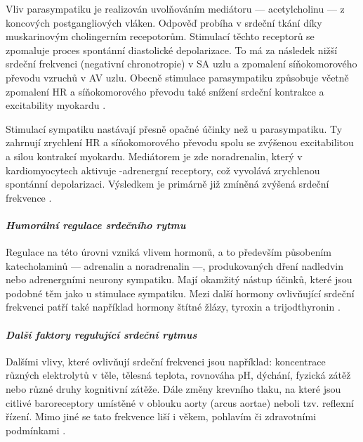 Vliv parasympatiku je realizován uvolňováním mediátoru --- acetylcholinu --- z
koncových postgangliových vláken. Odpověď probíha v srdeční tkání díky
muskarinovým cholingerním recepotorům. Stimulací těchto receptorů se zpomaluje
proces spontánní diastolické depolarizace. To má za následek nižší srdeční
frekvenci (negativní chronotropie) v SA uzlu a zpomalení síňokomorového převodu
vzruchů v AV uzlu. Obecně stimulace parasympatiku způsobuje včetně zpomalení HR
a síňokomorového převodu také snížení srdeční kontrakce a excitability myokardu
\cite{Kittnar2020}.

Stimulací sympatiku nastávají přesně opačné účinky než u parasympatiku. Ty
zahrnují zrychlení HR a síňokomorového převodu spolu se zvýšenou excitabilitou a
silou kontrakcí myokardu. Mediátorem je zde noradrenalin, který v
kardiomyocytech aktivuje \textbeta-adrenergní receptory, což vyvolává zrychlenou
spontánní depolarizaci. Výsledkem je primárně již zmíněná zvýšená srdeční
frekvence \cite{Kittnar2020}.

\paragraph*{\textit{Humorální regulace srdečního rytmu}\\} Regulace na této
úrovni vzniká vlivem hormonů, a to především působením katecholaminů ---
adrenalin a noradrenalin ---, produkovaných dření nadledvin nebo adrenergními
neurony sympatiku. Mají okamžitý nástup účinků, které jsou podobné těm jako u
stimulace sympatiku. Mezi další hormony ovlivňující srdeční frekvenci patří také
například hormony štítné žlázy, tyroxin a trijodthyronin
\cite{Kittnar2020,Orel2019}.

\paragraph*{\textit{Další faktory regulující srdeční rytmus}\\} Dalšími vlivy,
které ovlivňují srdeční frekvenci jsou například: koncentrace různých
elektrolytů v těle, tělesná teplota, rovnováha pH, dýchání, fyzická zátěž nebo
různé druhy kognitivní zátěže. Dále změny krevního tlaku, na které jsou citlivé
baroreceptory umístěné v oblouku aorty (arcus aortae) neboli tzv. reflexní
řízení. Mimo jiné se tato frekvence liší i věkem, pohlavím či zdravotními
podmínkami \cite{Kittnar2020}.

